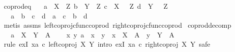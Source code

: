 \begin{isabellebody}
\isanewline
%
\endisadelimproof
\isanewline
{}\isamarkupfalse%
\ coprod{\isacharunderscore}{\kern0pt}eq{}{\isacharcolon}{\kern0pt}\isanewline
\ \ \ {\isachardoublequoteopen}a\ {\isacharcolon}{\kern0pt}\ X\ {\isasymrightarrow}\ Z{\isachardoublequoteclose}\ {\isachardoublequoteopen}b\ {\isacharcolon}{\kern0pt}\ Y\ {\isasymrightarrow}\ Z{\isachardoublequoteclose}\ {\isachardoublequoteopen}c\ {\isacharcolon}{\kern0pt}\ X\ {\isasymrightarrow}\ \ Z{\isachardoublequoteclose}\ {\isachardoublequoteopen}d\ {\isacharcolon}{\kern0pt}\ Y\ {\isasymrightarrow}\ \ Z{\isachardoublequoteclose}\isanewline
\ \ \ {\isachardoublequoteopen}{\isacharparenleft}{\kern0pt}a\ {\isasymamalg}\ b{\isacharparenright}{\kern0pt}\ {\isacharequal}{\kern0pt}\ {\isacharparenleft}{\kern0pt}c\ {\isasymamalg}\ d{\isacharparenright}{\kern0pt}\ {\isasymlongleftrightarrow}\ {\isacharparenleft}{\kern0pt}a\ {\isacharequal}{\kern0pt}\ c\ {\isasymand}\ b\ {\isacharequal}{\kern0pt}\ d{\isacharparenright}{\kern0pt}{\isachardoublequoteclose}\isanewline
%
\isadelimproof
\ \ %
\endisadelimproof
%
\isatagproof
{}\isamarkupfalse%
\ {\isacharparenleft}{\kern0pt}metis\ assms\ left{\isacharunderscore}{\kern0pt}coproj{\isacharunderscore}{\kern0pt}cfunc{\isacharunderscore}{\kern0pt}coprod\ right{\isacharunderscore}{\kern0pt}coproj{\isacharunderscore}{\kern0pt}cfunc{\isacharunderscore}{\kern0pt}coprod{\isacharparenright}{\kern0pt}%
\endisatagproof
{\isafoldproof}%
%
\isadelimproof
\isanewline
%
\endisadelimproof
\isanewline
{}\isamarkupfalse%
\ coprod{\isacharunderscore}{\kern0pt}decomp{\isacharcolon}{\kern0pt}\isanewline
\ \ \ {\isachardoublequoteopen}a\ {\isacharcolon}{\kern0pt}\ X\ {\isasymCoprod}\ Y\ {\isasymrightarrow}\ A{\isachardoublequoteclose}\isanewline
\ \ \ {\isachardoublequoteopen}{\isasymexists}\ x\ y{\isachardot}{\kern0pt}\ a\ {\isacharequal}{\kern0pt}\ {\isacharparenleft}{\kern0pt}x\ {\isasymamalg}\ y{\isacharparenright}{\kern0pt}\ {\isasymand}\ x\ {\isacharcolon}{\kern0pt}\ X\ {\isasymrightarrow}\ A\ {\isasymand}\ y\ {\isacharcolon}{\kern0pt}\ Y\ {\isasymrightarrow}\ A{\isachardoublequoteclose}\isanewline
%
\isadelimproof
%
\endisadelimproof
%
\isatagproof
{}\isamarkupfalse%
\ {\isacharparenleft}{\kern0pt}rule\ exI{\isacharbrackleft}{\kern0pt}\ x{\isacharequal}{\kern0pt}{\isachardoublequoteopen}a\ {\isasymcirc}\isactrlsub c\ left{\isacharunderscore}{\kern0pt}coproj\ X\ Y{\isachardoublequoteclose}{\isacharbrackright}{\kern0pt}{\isacharcomma}{\kern0pt}\ intro\ exI{\isacharbrackleft}{\kern0pt}\ x{\isacharequal}{\kern0pt}{\isachardoublequoteopen}a\ {\isasymcirc}\isactrlsub c\ right{\isacharunderscore}{\kern0pt}coproj\ X\ Y{\isachardoublequoteclose}{\isacharbrackright}{\kern0pt}{\isacharcomma}{\kern0pt}\ safe{\isacharparenright}{\kern0pt}\isanewline

\end{isabellebody}
